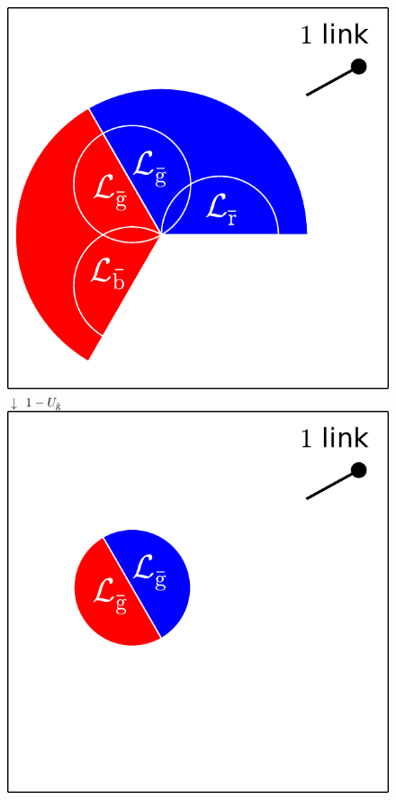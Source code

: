 \documentclass[aps, pre, onecolumn, a4paper, floatfix]{revtex4}
\begin{document}
\begin{figure}[htb]
\begin{minipage}[b]{0.2\linewidth}
\begin{center}
    \includegraphics[width=0.99\columnwidth]{sets_1_no_2_gc.pdf}\\
     \vspace{1mm}
    {\large $\downarrow$} $1-U_{\bar{\rm g}}$\\
     \vspace{1mm}
    \includegraphics[width=0.99\columnwidth]{sets_1_gc_no_2.pdf}\\

\end{center}
\end{minipage}
\end{figure}
\end{document}
